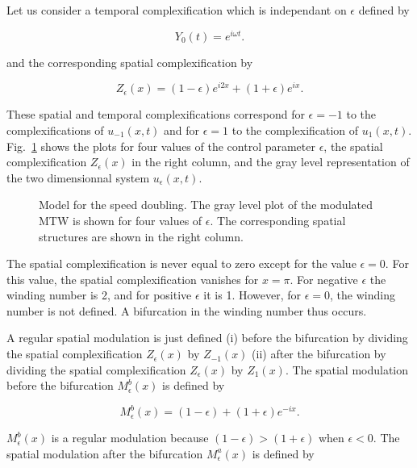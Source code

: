 \medskip

Let us consider a temporal complexification 
which is  independant on $\epsilon$ defined by 

\begin{equation}
Y_0(t)=e^{i\omega t}.
\end{equation}

and the corresponding spatial complexification by 

\begin{equation}
Z_{\epsilon}(x)=(1-\epsilon)e^{i2x}+(1+\epsilon)e^{ix}.
\end{equation}

These spatial  and temporal complexifications correspond for 
$\epsilon=-1$ to the complexifications of  $u_{-1}(x,t)$ 
and  for $\epsilon=1$ to the complexification of
 $u_{1}(x,t)$.
Fig.~\ref{model} shows the plots for four values
of the control parameter $\epsilon$,
the spatial complexification $Z_{\epsilon}(x)$ in the right column,
and the gray level representation of the two dimensionnal 
system $u_{\epsilon}(x,t)$.


\begin{figure}
\centering
{}    
\caption{Model for the speed doubling. The gray level plot of
the modulated MTW is shown for four values of $\epsilon$. 
The corresponding spatial structures are shown in the right column.} 
\label{model}   
\end{figure}

The spatial complexification is never equal to zero except 
for the value $\epsilon=0$. 
For this value, the spatial complexification vanishes for
$x=\pi$. 
For negative $\epsilon$ the winding number is 2, and for positive
$\epsilon$ it is 1.
However, for $\epsilon=0$, the winding number is not defined. 
A bifurcation in the winding number thus occurs.

\medskip

A regular spatial modulation is just defined (i) before the bifurcation
by dividing the spatial complexification $Z_{\epsilon}(x)$ by 
$Z_{-1}(x)$ (ii) after the bifurcation by dividing the spatial
complexification $Z_{\epsilon}(x)$ by $Z_{1}(x)$.
The spatial modulation before the bifurcation $M^b_{\epsilon}(x)$ 
is defined by 

\begin{equation}
M^b_{\epsilon}(x)=(1-\epsilon)+(1+\epsilon)e^{-ix}.
\end{equation}

$M^b_{\epsilon}(x)$ is a regular modulation because 
$(1-\epsilon)>(1+\epsilon)$ when $\epsilon<0$.
The spatial modulation after the bifurcation $M^a_{\epsilon}(x)$ 
is defined by 

